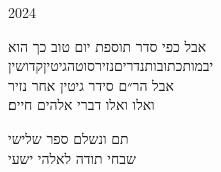 \documentclass[14pt, a5paper, twoside, extrafontsizes]{memoir}
\begin{document}
\frontmatter
\pagestyle{myheadings}
\thispagestyle{mytitlepage}
\begin{hebrew}
            {2024}


\vspace{1em}
{
\parskip 2pt


\vspace{4pt}
       { \centering
         \small
  {\larger  אבל} כפי סדר תוספת יום טוב כך הוא\\
  יבמות\hdot כתובות\hdot נדרים\hdot נזיר\hdot סוטה\hdot גיטין\hdot קדושין\\
  אבל הר״ם סידר גיטין אחר נזיר\\
  ואלו ואלו דברי אלהים חיים׃}

}
\mainmatter
\thispagestyle{empty}










\def \sederCount{שלישי}


{\centering
  \LARGE תם ונשלם ספר שלישי\\שבחי תודה לאלהי ישעי
}

\end{hebrew}
\end{document}
